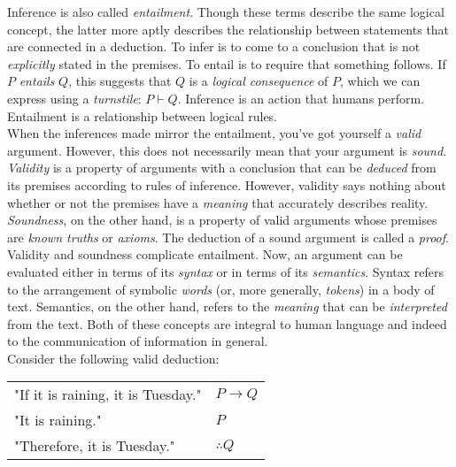 Inference is also called \textit{entailment}. Though these terms describe the same logical concept, the latter more aptly describes the relationship between statements that are connected in a deduction. To infer is to come to a conclusion that is not \textit{explicitly} stated in the premises. To entail is to require that something follows. If $P$ \textit{entails} $Q$, this suggests that $Q$ is a \textit{logical consequence} of $P$, which we can express using a \textit{turnstile}: $P\vdash Q$. Inference is an action that humans perform. Entailment is a relationship between logical rules. \\

When the inferences made mirror the entailment, you've got yourself a \textit{valid} argument. However, this does not necessarily mean that your argument is \textit{sound}. \textit{Validity} is a property of arguments with a conclusion that can be \textit{deduced} from its premises according to rules of inference. However, validity says nothing about whether or not the premises have a \textit{meaning} that accurately describes reality. \textit{Soundness}, on the other hand, is a property of valid arguments whose premises are \textit{known truths} or \textit{axioms}. The deduction of a sound argument is called a \textit{proof}. \\

Validity and soundness complicate entailment. Now, an argument can be evaluated either in terms of its \textit{syntax} or in terms of its \textit{semantics}. Syntax refers to the arrangement of symbolic \textit{words} (or, more generally, \textit{tokens}) in a body of text. Semantics, on the other hand, refers to the \textit{meaning} that can be \textit{interpreted} from the text. Both of these concepts are integral to human language and indeed to the communication of information in general. \\

Consider the following valid deduction: \\

\begin{center}
	\begin{tabular*}{0.55\textwidth}{@{\extracolsep{\fill} } ll}
		\textnormal{"If it is raining, it is Tuesday."} & $P\rightarrow Q$ \\
		\textnormal{"It is raining."} & $P$ \\
		\hline
		\textnormal{"Therefore, it is Tuesday."} & $\therefore Q$ \\
	\end{tabular*}
\end{center}
\vspace{4mm}

